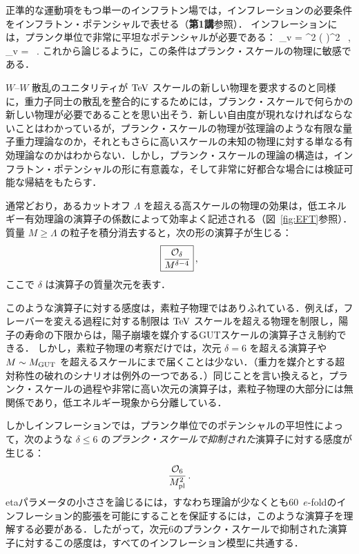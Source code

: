 正準的な運動項をもつ単一のインフラトン場では，インフレーションの必要条件をインフラトン・ポテンシャルで表せる（{\bf 第1講}参照）．
インフレーションには，プランク単位で非常に平坦なポテンシャルが必要である：
 \beq
 \epsilon_{\rm v} = \Mp^2 \left(  \right)^2 \, , \qquad \eta_{\rm v} =   \, .
 \eeq
これから論じるように，この条件はプランク・スケールの物理に敏感である．

$W$--$W$ 散乱のユニタリティが ${\rm TeV}$ スケールの新しい物理を要求するのと同様に，重力子同士の散乱を整合的にするためには，プランク・スケールで何らかの新しい物理が必要であることを思い出そう．新しい自由度が現れなければならないことはわかっているが，プランク・スケールの物理が弦理論のような有限な量子重力理論なのか，それともさらに高いスケールの未知の物理に対する単なる有効理論なのかはわからない．しかし，プランク・スケールの理論の構造は，インフラトン・ポテンシャルの形に有意義な，そして非常に好都合な場合には検証可能な帰結をもたらす．

通常どおり，あるカットオフ $\Lambda$ を超える高スケールの物理の効果は，低エネルギー有効理論の演算子の係数によって効率よく記述される（図~\ref{fig:EFT}参照）．質量 $M \ge \Lambda$ の粒子を積分消去すると，次の形の演算子が生じる：
\begin{equation}
\label{equ:ODelta}
\fbox{$\displaystyle \frac{{\cal{O}}_{\delta}}{M^{\delta-4}} $}\, ,
\end{equation}
ここで $\delta$ は演算子の質量次元を表す．

このような演算子に対する感度は，素粒子物理ではありふれている．例えば，フレーバーを変える過程に対する制限は ${\rm TeV}$ スケールを超える物理を制限し，陽子の寿命の下限からは，陽子崩壊を媒介するGUTスケールの演算子さえ制約できる．
しかし，素粒子物理の考察だけでは，次元 $\delta=6$ を超える演算子や $M\sim M_{\rm GUT}$ を超えるスケールにまで届くことは少ない．（重力を媒介とする超対称性の破れのシナリオは例外の一つである．）同じことを言い換えると，プランク・スケールの過程や非常に高い次元の演算子は，素粒子物理の大部分には無関係であり，低エネルギー現象から分離している．

しかしインフレーションでは，プランク単位でのポテンシャルの平坦性によって，次のような $\delta\le 6$ の{\it プランク・スケールで抑制された}演算子に対する感度が生じる：
\begin{equation}
\label{equ:O6}
\frac{{\cal{O}}_{6}}{M_{\rm pl}^{2}}\, .
\end{equation}
etaパラメータの小ささを論じるには，すなわち理論が少なくとも60~$e$-foldのインフレーション的膨張を可能にすることを保証するには，このような演算子を理解する必要がある．したがって，次元6のプランク・スケールで抑制された演算子に対するこの感度は，すべてのインフレーション模型に共通する．

